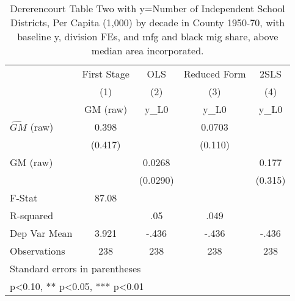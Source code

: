 \begin{table}[htbp]\centering
\def\sym#1{\ifmmode^{#1}\else\(^{#1}\)\fi}
\caption{Dererencourt Table Two with y=Number of Independent School Districts, Per Capita (1,000) by decade in County 1950-70, with baseline y, division FEs, and mfg and black mig share, above median area incorporated.}
\begin{tabular}{l*{4}{c}}
\toprule
                    & First Stage   &         OLS   &Reduced Form   &        2SLS   \\
                    &\multicolumn{1}{c}{(1)}&\multicolumn{1}{c}{(2)}&\multicolumn{1}{c}{(3)}&\multicolumn{1}{c}{(4)}\\
                    &\multicolumn{1}{c}{GM  (raw)}&\multicolumn{1}{c}{y\_L0}&\multicolumn{1}{c}{y\_L0}&\multicolumn{1}{c}{y\_L0}\\
\midrule
$\hat{GM}$ (raw)    &       0.398   &               &      0.0703   &               \\
                    &     (0.417)   &               &     (0.110)   &               \\
\addlinespace
GM  (raw)           &               &      0.0268   &               &       0.177   \\
                    &               &    (0.0290)   &               &     (0.315)   \\
\midrule
F-Stat              &       87.08   &               &               &               \\
R-squared           &               &         .05   &        .049   &               \\
Dep Var Mean        &       3.921   &       -.436   &       -.436   &       -.436   \\
Observations        &         238   &         238   &         238   &         238   \\
\bottomrule
\multicolumn{5}{l}{\footnotesize Standard errors in parentheses}\\
\multicolumn{5}{l}{\footnotesize * p<0.10, ** p<0.05, *** p<0.01}\\
\end{tabular}
\end{table}
